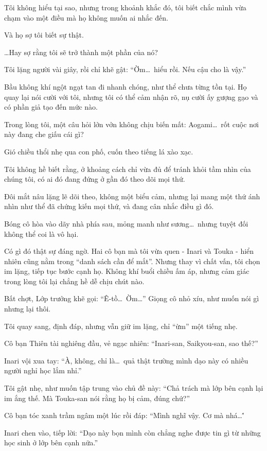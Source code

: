 \documentclass[../main.tex]{subfiles}
\begin{document}
Tôi không hiểu tại sao, nhưng trong khoảnh khắc đó, tôi biết chắc mình vừa chạm vào một điều mà họ không muốn ai nhắc đến.

Và họ sợ tôi biết sự thật.

\dots Hay sợ rằng tôi sẽ trở thành một phần của nó?

Tôi lặng người vài giây, rồi chỉ khẽ gật: ``Ờm\dots\ hiểu rồi. Nếu cậu cho là vậy.''

Bầu không khí ngột ngạt tan đi nhanh chóng, như thể chưa từng tồn tại. Họ quay lại nói cười với tôi, nhưng tôi có thể cảm nhận rõ, nụ cười ấy gượng gạo và có phần giả tạo đến mức nào.

Trong lòng tôi, một câu hỏi lởn vởn không chịu biến mất: Aogami\dots\ rốt cuộc nơi này đang che giấu cái gì?

Gió chiều thổi nhẹ qua con phố, cuốn theo tiếng lá xào xạc.

Tôi không hề biết rằng, ở khoảng cách chỉ vừa đủ để tránh khỏi tầm nhìn của chúng tôi, có ai đó đang đứng ở gần đó theo dõi mọi thứ.

Đôi mắt nâu lặng lẽ dõi theo, không một biểu cảm, nhưng lại mang một thứ ánh nhìn như thể đã chứng kiến mọi thứ, và đang cân nhắc điều gì đó.

Bóng cô hòa vào dãy nhà phía sau, mỏng manh như sương\dots\ nhưng tuyệt đối không thể coi là vô hại.

Có gì đó thật sự đáng ngờ. Hai cô bạn mà tôi vừa quen - Inari và Touka - hiển nhiên cũng nằm trong ``danh sách cần để mắt''. Nhưng thay vì chất vấn, tôi chọn im lặng, tiếp tục bước cạnh họ. Không khí buổi chiều ấm áp, nhưng cảm giác trong lòng tôi lại chẳng hề dễ chịu chút nào.

Bất chợt, Lớp trưởng khẽ gọi: ``Ê-tồ\dots\ Ờm\dots'' Giọng cô nhỏ xíu, như muốn nói gì nhưng lại thôi.

Tôi quay sang, định đáp, nhưng vẫn giữ im lặng, chỉ ``ừm'' một tiếng nhẹ.

Cô bạn Thiên tài nghiêng đầu, vẻ ngạc nhiên: ``Inari-san, Saikyou-san, sao thế?''

Inari vội xua tay: ``À, không, chỉ là\dots\ quả thật trường mình dạo này có nhiều người nghỉ học lắm nhỉ.''

Tôi gật nhẹ, như muốn tập trung vào chủ đề này: ``Chả trách mà lớp bên cạnh lại im ắng thế. Mà Touka-san nói rằng họ bị cảm, đúng chứ?''

Cô bạn tóc xanh trầm ngâm một lúc rồi đáp: ``Mình nghĩ vậy. Cơ mà nhá\dots\''

Inari chen vào, tiếp lời: ``Dạo này bọn mình còn chẳng nghe được tin gì từ những học sinh ở lớp bên cạnh nữa.''
\end{document}
